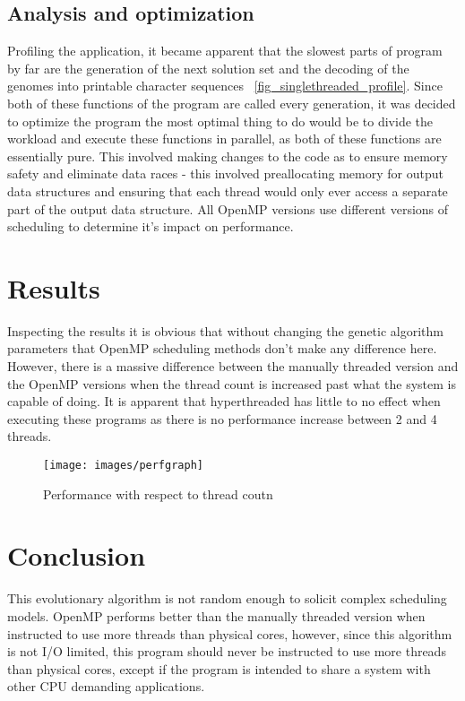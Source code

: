 \documentclass[journal,transmag]{IEEEtran}
\begin{document}
        \subsection{Analysis and optimization} 
        Profiling the application, it became apparent that the slowest parts of program
        by far are the generation of the next solution set and the decoding of the genomes
        into printable character sequences ~\ref{fig_singlethreaded_profile}. Since both of these
        functions of the program are called every generation, it was decided to optimize the program
        the most optimal thing to do would be to divide the workload and execute these
        functions in parallel, as both of these functions are essentially pure. This involved making
        changes to the code as to ensure memory safety and eliminate data races - this involved
        preallocating memory for output data structures and ensuring that each thread would
        only ever access a separate part of the output data structure. All OpenMP versions use
        different versions of scheduling to determine it's impact on performance.

        

        
        
        
        

\section{Results}
Inspecting the results it is obvious that without changing the genetic algorithm parameters
that OpenMP scheduling methods don't make any difference here. However, there is a massive
difference between the manually threaded version and the OpenMP versions when the thread count
is increased past what the system is capable of doing. It is apparent that hyperthreaded
has little to no effect when executing these programs as there is no performance increase
between 2 and 4 threads.

	
	
\begin{figure}[!t]
\centering
\texttt{[image: images/perfgraph]}
\caption{Performance with respect to thread coutn}
\label{fig_performance_dif}
\end{figure}


\section{Conclusion}
This evolutionary algorithm is not  random enough to solicit complex scheduling models.
OpenMP performs better than the manually threaded version when instructed to use more 
threads than physical cores, however, since this algorithm is not I/O limited, this
program should never be instructed to use more threads than physical cores, except if
the program is intended to share a system with other CPU demanding applications.
\end{document}
